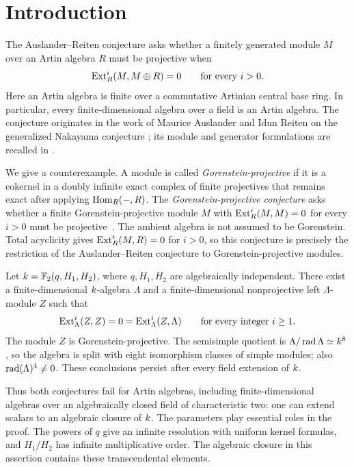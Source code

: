 \section{Introduction}

The Auslander--Reiten conjecture asks whether a finitely generated module
$M$ over an Artin algebra $R$ must be projective when
\begin{equation}\label{eq:arc}
 \operatorname{Ext}_R^i(M,M\oplus R)=0\qquad\text{for every }i>0.
\end{equation}
Here an Artin algebra is finite over a commutative Artinian central base
ring. In particular, every finite-dimensional algebra over a field is
an Artin algebra. The conjecture originates in the work of Maurice Auslander and
Idun Reiten on the generalized Nakayama conjecture
\cite{AuslanderReiten1975}; its module and generator formulations are
recalled in \cite[Introduction]{HunekeLeuschke2004}.

We give a counterexample. A module is called \emph{Gorenstein-projective}
if it is a cokernel in a doubly infinite exact complex of finite
projectives that remains exact after applying $\operatorname{Hom}_R(-,R)$.
The \emph{Gorenstein-projective conjecture} asks whether a finite
Gorenstein-projective module $M$ with $\operatorname{Ext}_R^i(M,M)=0$ for every
$i>0$ must be projective~\cite[p.~2]{LuoHuang2008}. The ambient algebra
is not assumed to be Gorenstein. Total acyclicity gives
$\operatorname{Ext}_R^i(M,R)=0$ for $i>0$, so this conjecture is precisely the
restriction of the Auslander--Reiten conjecture to Gorenstein-projective
modules.

\begin{theorem}\label{thm:main}
Let $k=\mathbb F_2(q,H_1,H_2)$, where $q,H_1,H_2$ are algebraically
independent. There exist a finite-dimensional $k$-algebra $\Lambda$
and a finite-dimensional nonprojective left $\Lambda$-module $Z$ such that
\[
 \operatorname{Ext}^i_\Lambda(Z,Z)=0=\operatorname{Ext}^i_\Lambda(Z,\Lambda)
 \qquad\text{for every integer }i\geq1.
\]
The module $Z$ is Gorenstein-projective. The semisimple quotient is
$\Lambda/\operatorname{rad}\Lambda\simeq k^8$, so the algebra is split with eight
isomorphism classes of simple modules; also $\operatorname{rad}(\Lambda)^4\ne0$.
These conclusions persist after every field extension of $k$.
\end{theorem}

Thus both conjectures fail for Artin algebras, including finite-dimensional
algebras over an algebraically closed field of characteristic two:
one can extend scalars to an algebraic closure of $k$. The parameters
play essential roles in the proof. The powers of $q$ give an infinite
resolution with uniform kernel formulas, and $H_1/H_2$ has infinite
multiplicative order. The algebraic closure in this assertion contains
these transcendental elements.

